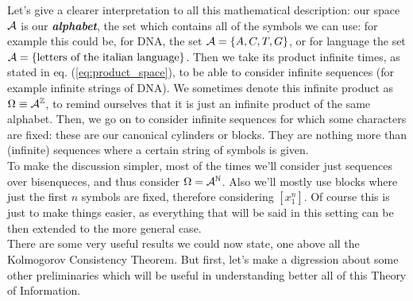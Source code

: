 Let's give a clearer interpretation to all this mathematical description: our space $\mathcal{A}$ is our \textit{\textbf{alphabet}}, the set which contains all of the symbols we can use: for example this could be, for DNA, the set $\mathcal{A}= \{ A,C,T,G \}$, or for language the set $\mathcal{A} = \{ \text{letters of the italian language} \}$. Then we take its product infinite times, as stated in eq. (\ref{eq:product_space}), to be able to consider infinite sequences (for example infinite strings of DNA). We sometimes denote this infinite product as $\Omega \equiv \mathcal{A}^{\mathbb{Z}}$, to remind ourselves that it is just an infinite product of the same alphabet. Then, we go on to consider infinite sequences for which some characters are fixed: these are our canonical cylinders or blocks. They are nothing more than (infinite) sequences where a certain string of symbols is given. 
\\To make the discussion simpler, most of the times we'll consider just sequences over bisenqueces, and thus consider $\Omega=\mathcal{A}^{\mathbb{N}}$. Also we'll mostly use blocks where just the first $n$ symbols are fixed, therefore considering $[x_1^n]$. Of course this is just to make things easier, as everything that will be said in this setting can be then extended to the more general case. 
\\There are some very useful results we could now state, one above all the Kolmogorov Consistency Theorem. But first, let's make a digression about some other preliminaries which will be useful in understanding better all of this Theory of Information.

